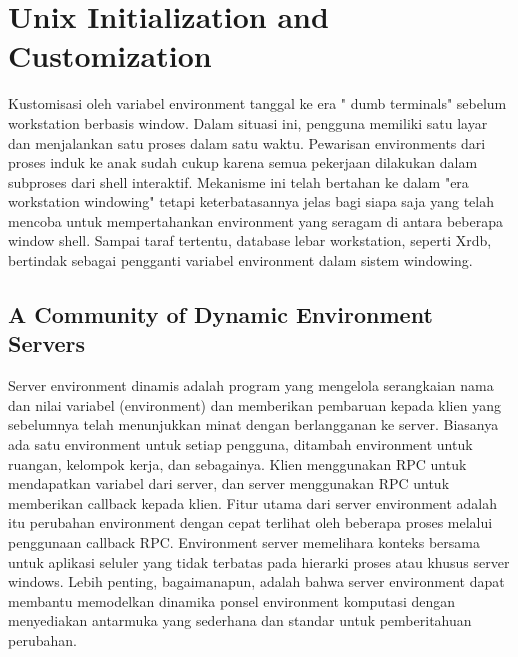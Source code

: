 \section {Unix Initialization and Customization}

Kustomisasi oleh variabel environment tanggal ke era " dumb terminals" sebelum workstation berbasis window. Dalam situasi ini, pengguna memiliki satu layar dan menjalankan satu proses dalam satu waktu. Pewarisan environments dari proses induk ke anak sudah cukup karena semua pekerjaan dilakukan dalam subproses dari shell interaktif. Mekanisme ini telah bertahan ke dalam "era workstation windowing" tetapi keterbatasannya jelas bagi siapa saja yang telah mencoba untuk mempertahankan environment yang seragam di antara beberapa window shell. Sampai taraf tertentu, database lebar workstation, seperti Xrdb, bertindak sebagai pengganti variabel environment dalam sistem windowing. \cite{schilit1993customizing}

\subsection {A Community of Dynamic Environment Servers}

Server environment dinamis adalah program yang mengelola serangkaian nama dan nilai variabel (environment) dan memberikan pembaruan kepada klien yang sebelumnya telah menunjukkan minat dengan berlangganan ke server. Biasanya ada satu environment untuk setiap pengguna, ditambah environment untuk ruangan, kelompok kerja, dan sebagainya. Klien menggunakan RPC untuk mendapatkan variabel dari server, dan server menggunakan RPC untuk memberikan callback kepada klien. Fitur utama dari server environment adalah itu perubahan environment dengan cepat terlihat oleh beberapa proses melalui penggunaan callback RPC. Environment server memelihara konteks bersama untuk aplikasi seluler yang tidak terbatas pada hierarki proses atau khusus server windows. Lebih penting, bagaimanapun, adalah bahwa server environment dapat membantu memodelkan dinamika ponsel environment komputasi dengan menyediakan antarmuka yang sederhana dan standar untuk pemberitahuan perubahan. \cite{schilit1993customizing}









